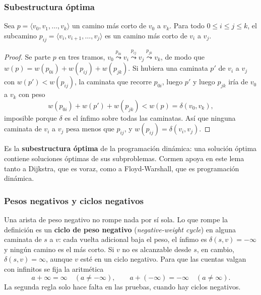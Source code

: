 \documentclass[11pt,letterpaper]{article}
\begin{document}
\subsubsection*{Subestructura óptima}

\begin{lema}\label{lem:subcaminos-cortos}
  Sea $p = \langle v_0, v_1, \dots, v_k\rangle$ un camino más corto
  de $v_0$ a $v_k$. Para todo $0 \le i \le j \le k$, el subcamino
  $p_{ij} = \langle v_i, v_{i+1}, \dots, v_j\rangle$ es un camino más
  corto de $v_i$ a $v_j$.
\end{lema}

\begin{proof}
  Se parte $p$ en tres tramos,
  $v_0 \overset{p_{0i}}{\leadsto} v_i \overset{p_{ij}}{\leadsto} v_j
  \overset{p_{jk}}{\leadsto} v_k$, de modo que
  $w(p) = w(p_{0i}) + w(p_{ij}) + w(p_{jk})$. Si hubiera una caminata
  $p'$ de $v_i$ a $v_j$ con $w(p') < w(p_{ij})$, la caminata que
  recorre $p_{0i}$, luego $p'$ y luego $p_{jk}$ iría de $v_0$ a $v_k$
  con peso
  \[
    w(p_{0i}) + w(p') + w(p_{jk}) < w(p) = \delta(v_0, v_k) ,
  \]
  imposible porque $\delta$ es el ínfimo sobre todas las caminatas.
  Así que ninguna caminata de $v_i$ a $v_j$ pesa menos que $p_{ij}$, y
  $w(p_{ij}) = \delta(v_i, v_j)$.
\end{proof}

Es la \textbf{subestructura óptima} de la programación dinámica: una
solución óptima contiene soluciones óptimas de sus subproblemas.
Cormen apoya en este lema tanto a Dijkstra, que es voraz, como a
Floyd-Warshall, que es programación dinámica.

\subsubsection*{Pesos negativos y ciclos negativos}

Una arista de peso negativo no rompe nada por sí sola. Lo que rompe la
definición es un \textbf{ciclo de peso negativo}
(\textit{negative-weight cycle}) en alguna caminata de $s$ a $v$: cada
vuelta adicional baja el peso, el ínfimo es $\delta(s, v) = -\infty$ y
ningún camino es el más corto. Si $v$ no es alcanzable desde $s$, en
cambio, $\delta(s, v) = \infty$, aunque $v$ esté en un ciclo negativo.
Para que las cuentas valgan con infinitos se fija la aritmética
\[
  a + \infty = \infty \quad (a \neq -\infty) , \qquad
  a + (-\infty) = -\infty \quad (a \neq \infty) .
\]
La segunda regla solo hace falta en las pruebas, cuando hay ciclos
negativos.
\end{document}

